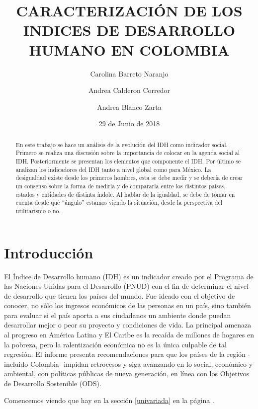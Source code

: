 \documentclass{article}
\title{CARACTERIZACIÓN DE LOS INDICES DE DESARROLLO HUMANO EN COLOMBIA}
\author[1]{\normalsize Carolina Barreto Naranjo}
\author[2]{\normalsize Andrea Calderon Corredor}
\author[3]{\normalsize Andrea Blanco Zarta}
\affil[1,2,3]{\small  Facultad de Ingeniería,Universidad de los Andes\\
\texttt{{c.barreto805,a.calderon,a.blanco}@uniandes.edu.co}}
\affil[1,2,3]{\small Herramientas Computacionales para la Investigación\\}
\date{29 de Junio de 2018}
\begin{document}


\maketitle


\begin{abstract}
En este trabajo se hace un análisis de la evolución del IDH como indicador social. Primero se realiza una discusión sobre la importancia de colocar en la agenda social al IDH. Posteriormente se presentan los elementos que componente el IDH. Por último se analizan los indicadores del IDH tanto a nivel global como para México. La desigualdad existe desde los primeros hombres, esta se debe medir y se debería de crear un consenso sobre la forma de medirla y de compararla entre los distintos países, estados y entidades de distinta índole. Al hablar de la igualdad, se debe de tomar en cuenta desde qué “ángulo” estamos viendo la situación, desde la perspectiva del utilitarismo o no.
\end{abstract}

\section*{Introducción}

El Índice de Desarrollo humano (IDH) es un indicador creado por el Programa de las Naciones Unidas para el Desarrollo (PNUD) con el fin de determinar el nivel de desarrollo que tienen los países del mundo.  Fue ideado con el objetivo de conocer, no sólo los ingresos económicos de las personas en un país, sino también para evaluar si el país aporta a sus ciudadanos un ambiente donde puedan desarrollar mejor o peor su proyecto y condiciones de vida. La principal amenaza al progreso en América Latina y El Caribe es la recaída de millones de hogares en la pobreza, pero la ralentización económica no es la única culpable de tal regresión. El informe presenta recomendaciones para que los países de la región -incluido Colombia- impidan retrocesos y siga avanzando en lo social, económico y ambiental, con políticas públicas de nueva generación, en línea con los Objetivos de Desarrollo Sostenible (ODS).
 
Comencemos viendo que hay en la sección \ref{univariada} en la página \pageref{univariada}.

\clearpage



\clearpage



\clearpage


\clearpage




\renewcommand{\refname}{Bibliografia}

\end{document}
